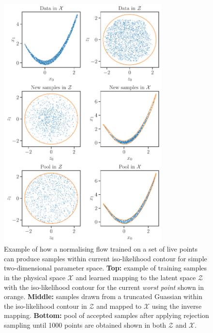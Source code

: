 \documentclass[%
 reprint,
nofootinbib,
 amsmath,amssymb,
 aps,
 prd,
]{revtex4-2}
\newcommand{\latent}{\mathcal{Z}}
\newcommand{\physical}{\mathcal{X}}
\newcommand{\figwidth}{8.6cm}
\begin{document}
\begin{figure}
    \centering
    \includegraphics[width=\figwidth]{figures/learning_contours.pdf}
    \caption{Example of how a normalising flow trained on a set of live points can produce samples within current iso-likelihood contour for simple two-dimensional parameter space. \textbf{Top:} example of training samples in the physical space $\physical$ and learned mapping to the latent space $\latent$ with the iso-likelihood contour for the current \textit{worst point} shown in orange. \textbf{Middle:} samples drawn from a truncated Guassian within the iso-likelihood contour in $\latent$ and mapped to $\physical$ using the inverse mapping. \textbf{Bottom:} pool of accepted samples after applying rejection sampling until 1000 points are obtained shown in both $\latent$ and $\physical$.}
    \label{fig:learning_contours}
\end{figure}
\end{document}
